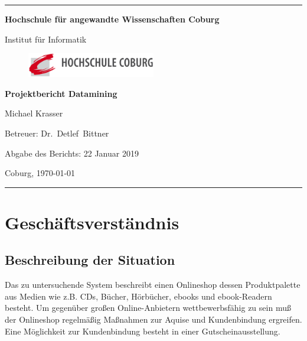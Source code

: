 \documentclass[a4paper,12pt]{article}
\begin{document}
\begin{titlepage}
\thispagestyle{empty} \enlargethispage{1.4in}

\begin{center}

\rule[1ex]{157.5mm}{0.5mm}

\LARGE\bf Hochschule für angewandte Wissenschaften Coburg\\

\vfill

\rm Institut für Informatik


\begin{figure}
	    \centering
				     \includegraphics[width=0.5\textwidth]{Logo.png}
\end{figure}

\vfill

\Huge \bf Projektbericht Datamining

\vfill

\normalsize Michael Krasser

\vfill

Betreuer:  Dr.~Detlef~Bittner

Abgabe des Berichts: 22 Januar 2019

\vfill

Coburg, \today

\rule[-1ex]{157.5mm}{0.5mm}

\vfill

\end{center}

\end{titlepage}

\newpage
\tableofcontents
\pagebreak
\section{Geschäftsverständnis}
\subsection{Beschreibung der Situation}
Das zu untersuchende System beschreibt einen Onlineshop dessen Produktpalette aus Medien wie z.B. CDs, Bücher, Hörbücher, ebooks und ebook-Readern besteht. Um gegenüber großen Online-Anbietern wettbewerbsfähig zu sein muß der Onlineshop regelmäßig Maßnahmen zur Aquise und Kundenbindung ergreifen. Eine Möglichkeit zur Kundenbindung besteht in einer Gutscheinausstellung. 
\end{document}
